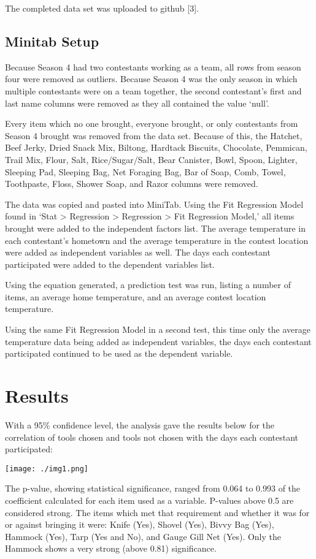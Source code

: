 \documentclass[letterpaper,twoside,11pt,twocolumn]{article}
\begin{document}
The completed data set was uploaded to github [3].
\subsection{Minitab Setup}
\noindent Because Season 4 had two contestants working as a team, all rows from season four were removed as outliers. Because Season 4 was the only season in which multiple contestants were on a team together, the second contestant's first and last name columns were removed as they all contained the value ‘null’. 

Every item which no one brought, everyone brought, or only contestants from Season 4 brought was removed from the data set. Because of this, the Hatchet, Beef Jerky, Dried Snack Mix, Biltong, Hardtack Biscuits, Chocolate, Pemmican, Trail Mix, Flour, Salt, Rice/Sugar/Salt, Bear Canister, Bowl, Spoon, Lighter, Sleeping Pad, Sleeping Bag, Net Foraging Bag, Bar of Soap, Comb, Towel, Toothpaste, Floss, Shower Soap, and Razor columns were removed. 

The data was copied and pasted into MiniTab. Using the Fit Regression Model found in ‘Stat > Regression > Regression > Fit Regression Model,’ all items brought were added to the independent factors list. The average temperature in each contestant’s hometown and the average temperature in the contest location were added as independent variables as well. The days each contestant participated were added to the dependent variables list.

Using the equation generated, a prediction test was run, listing a number of items, an average home temperature, and an average contest location temperature. 

Using the same Fit Regression Model in a second test, this time only the average temperature data being added as independent variables, the days each contestant participated continued to be used as the dependent variable.

\section{Results}
\noindent With a 95\% confidence level, the analysis gave the results below for the correlation of tools chosen and tools not chosen with the days each contestant participated:

\noindent\texttt{[image: ./img1.png]}

The p-value, showing statistical significance, ranged from 0.064 to 0.993 of the coefficient calculated for each item used as a variable. P-values above 0.5 are considered strong. The items which met that requirement and whether it was for or against bringing it were: Knife (Yes), Shovel (Yes), Bivvy Bag (Yes), Hammock (Yes), Tarp (Yes and No), and Gauge Gill Net (Yes). Only the Hammock shows a very strong (above 0.81) significance. 
\end{document}
